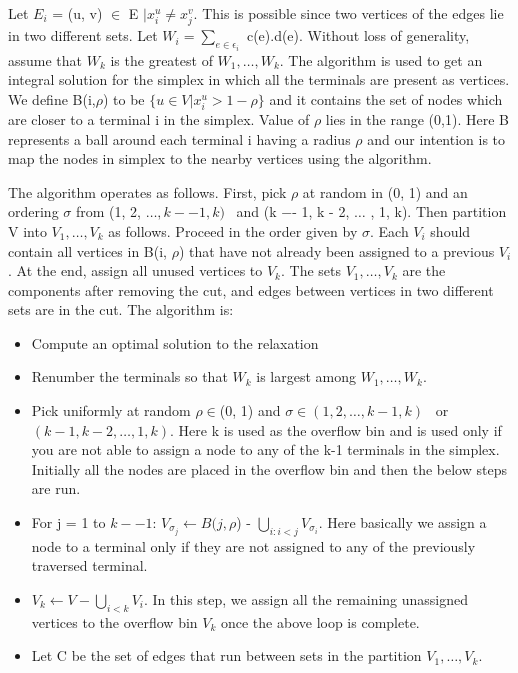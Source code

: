 \documentclass[11pt]{article}
\begin{document}
Let $E_i$ = (u, v) $\in$ E $\vert x_{i}^u \neq x_{j}^v$. This is possible since two vertices of the edges lie in two different sets. Let $W_i = \sum\limits_{e \in \epsilon_i}$ c(e).d(e). Without loss of generality, assume that $W_k$ is the greatest of $W_1, \dots , W_k$. The algorithm is used to get an integral solution for the simplex in which all the terminals are present as vertices. We define B(i,$\rho$) to be $\{u \in V \vert x_i^u > 1 - \rho \}$  and it contains the set of nodes which are closer to a terminal i in the simplex. Value of $\rho$ lies in the range (0,1). Here B represents a ball around each terminal i having a radius $\rho$ and our intention is to map the nodes in simplex to the nearby vertices using the algorithm.\\
\vspace{-10pt}

The algorithm operates as follows. First, pick $\rho$ at random in (0, 1) and an ordering $\sigma$ from (1, 2, $\dots, k −- 1, k)$ \ and (k −- 1, k - 2, $\dots$ , 1, k). Then partition V into $ V_1, \dots , V_k$ as follows. Proceed in the order given by $\sigma$. Each $V_i$ should contain all vertices in B(i, $\rho$) that have not already been assigned to a previous $V_i$. At the end, assign all unused vertices to $V_k$. The sets $V_1, \dots , V_k$ are the components after removing the cut, and edges between vertices in two different sets are in the cut. The algorithm is:
\begin{itemize} \itemsep -2pt
\item  Compute an optimal solution to the relaxation
\item Renumber the terminals so that $W_k$ is largest among $W_1, \dots , W_k$.
\item  Pick uniformly at random $\rho \in $(0, 1) and
$\sigma \in (1, 2, \dots , k - 1, k)$ \ or $ (k - 1, k - 2, \dots , 1, k)$. Here k is used as the overflow bin and is used only if you are not able to assign a node to any of the k-1 terminals in the simplex. Initially all the nodes are placed in the overflow bin and then the below steps are run.
\item For j = 1 to $k −- 1$: $V_{\sigma_j} \leftarrow B(j, \rho$) - $\bigcup\limits_{i:i<j} V_{\sigma_i}$. Here basically we assign a node to a terminal only if they are not assigned to any of the previously traversed terminal.\
\item $V_k \leftarrow V - \bigcup\limits_{i<k} V_i$. In this step, we assign all the remaining unassigned vertices to the overflow bin $V_k$ once the above loop is complete.

\item Let C be the set of edges that run between sets in the partition $V_1,\dots , V_k$.
\end{itemize}
\end{document}
